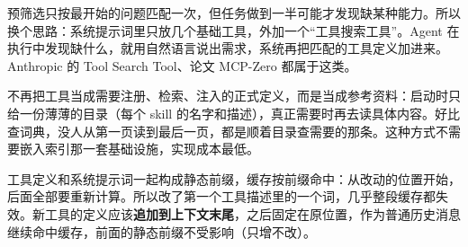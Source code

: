 预筛选只按最开始的问题匹配一次，但任务做到一半可能才发现缺某种能力。所以换个思路：系统提示词里只放几个基础工具，外加一个“工具搜索工具”。Agent 在执行中发现缺什么，就用自然语言说出需求，系统再把匹配的工具定义加进来。Anthropic 的 Tool Search Tool、论文 MCP-Zero 都属于这类。

不再把工具当成需要注册、检索、注入的正式定义，而是当成参考资料：启动时只给一份薄薄的目录（每个 skill 的名字和描述），真正需要时再去读具体内容。好比查词典，没人从第一页读到最后一页，都是顺着目录查需要的那条。这种方式不需要嵌入索引那一套基础设施，实现成本最低。

工具定义和系统提示词一起构成静态前缀，缓存按前缀命中：从改动的位置开始，后面全部要重新计算。所以改了第一个工具描述里的一个词，几乎整段缓存都失效。新工具的定义应该\textbf{追加到上下文末尾}，之后固定在原位置，作为普通历史消息继续命中缓存，前面的静态前缀不受影响（只增不改）。
